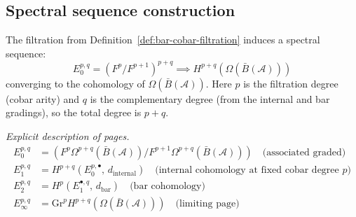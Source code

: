 \subsection{Spectral sequence construction}

\begin{theorem}\label{thm:bar-cobar-spectral-sequence}
\label{thm:koszul-spectral-sequence}
The filtration from Definition~\ref{def:bar-cobar-filtration} induces a spectral 
sequence:
\[E_0^{p,q} = \left(F^p / F^{p+1}\right)^{p+q} \implies H^{p+q}(\Omega(\bar{B}(\mathcal{A})))\]
converging to the cohomology of $\Omega(\bar{B}(\mathcal{A}))$.  Here $p$ is the filtration degree (cobar arity) and $q$ is the complementary degree (from the internal and bar gradings), so the total degree is $p + q$.

\emph{Explicit description of pages.}
\begin{align*}
E_0^{p,q} &= \left(F^p\Omega^{p+q}(\bar{B}(\mathcal{A})) \big/ F^{p+1}\Omega^{p+q}(\bar{B}(\mathcal{A}))\right) \quad \text{(associated graded)} \\
E_1^{p,q} &= H^{p+q}\!\left(E_0^{p,\bullet},\, d_{\text{internal}}\right)
            \quad \text{(internal cohomology at fixed cobar degree $p$)} \\
E_2^{p,q} &= H^p\!\left(E_1^{\bullet,q},\, d_{\text{bar}}\right)
            \quad \text{(bar cohomology)} \\
E_\infty^{p,q} &= \mathrm{Gr}^p H^{p+q}(\Omega(\bar{B}(\mathcal{A}))) \quad \text{(limiting page)}
\end{align*}
\end{theorem}

